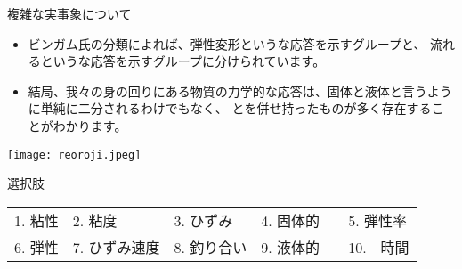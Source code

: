 \documentclass[uplatex,dvipdfmx,a4paper,11pt]{jsarticle}
\begin{document}
\begin{qlist}
\begin{qlist2}
			\vspace{5mm}
			\qitem 複雑な実事象について
				\begin{center}
					\begin{minipage}{0.4\textwidth}
						\begin{itemize}
							\item ビンガム氏の分類によれば、弾性変形という\qbox{}な応答を示すグループと、
							流れるという\qbox{}な応答を示すグループに分けられています。
							\item 結局、我々の身の回りにある物質の力学的な応答は、固体と液体と言うように単純に二分されるわけでもなく、
							\qbox{}と\qbox{}を併せ持ったものが多く存在することがわかります。
						\end{itemize}
					\end{minipage}
					\begin{minipage}{0.46\textwidth}
						\begin{center}
						\texttt{[image: reoroji.jpeg]}
						\end{center}
					\end{minipage}
				\end{center}

		\end{qlist2}

		\begin{itembox}[l]{選択肢}
			\begin{center}
				\begin{tabular}{lllll}
					1. 粘性	&2. 粘度	&3. ひずみ	&4. 固体的	&5. 弾性率\\
					6. 弾性	&7. ひずみ速度		&8. 釣り合い	&9. 液体的　&10.　時間
				\end{tabular}
			\end{center}
		\end{itembox}
\end{qlist}
\end{document}
